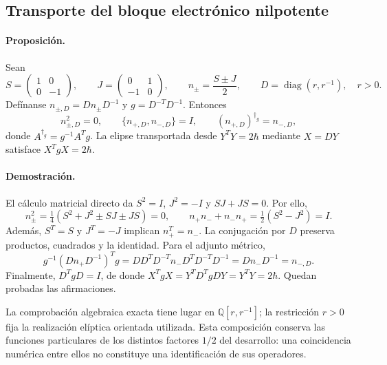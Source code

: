 \subsection{Transporte del bloque electrónico nilpotente}
\label{md:compos:nilpotentes}

\paragraph{Proposición.}
Sean
\begin{equation}
 S=\begin{pmatrix}1&0\\0&-1\end{pmatrix},\qquad
 J=\begin{pmatrix}0&1\\-1&0\end{pmatrix},\qquad
 n_\pm=\frac{S\pm J}{2},\qquad
 D=\operatorname{diag}(r,r^{-1}),\quad r>0.
 \label{md:compos:bloque-nilpotente}
\end{equation}
Defínanse $n_{\pm,D}=Dn_\pm D^{-1}$ y $g=D^{-T}D^{-1}$. Entonces
\begin{equation}
 n_{\pm,D}^2=0,\qquad
 \{n_{+,D},n_{-,D}\}=I,\qquad
 (n_{+,D})^{\dagger_g}=n_{-,D},
 \label{md:compos:identidades-nilpotentes}
\end{equation}
donde $A^{\dagger_g}=g^{-1}A^Tg$. La elipse transportada desde
$Y^TY=2\hbar$ mediante $X=DY$ satisface $X^TgX=2\hbar$.

\paragraph{Demostración.}
El cálculo matricial directo da
$S^2=I$, $J^2=-I$ y $SJ+JS=0$. Por ello,
\[
 n_\pm^2=\tfrac14(S^2+J^2\pm SJ\pm JS)=0,
 \qquad
 n_+n_-+n_-n_+=\tfrac12(S^2-J^2)=I.
\]
Además, $S^T=S$ y $J^T=-J$ implican $n_+^T=n_-$. La conjugación por $D$
preserva productos, cuadrados y la identidad. Para el adjunto métrico,
\[
 g^{-1}(Dn_+D^{-1})^Tg
 =DD^T D^{-T}n_-D^T D^{-T}D^{-1}
 =Dn_-D^{-1}=n_{-,D}.
\]
Finalmente, $D^TgD=I$, de donde
$X^TgX=Y^TD^TgDY=Y^TY=2\hbar$. Quedan probadas las afirmaciones.

La comprobación algebraica exacta tiene lugar en
$\mathbb Q[r,r^{-1}]$; la restricción $r>0$ fija la realización elíptica
orientada utilizada. Esta composición conserva las funciones particulares
de los distintos factores $1/2$ del desarrollo: una coincidencia numérica
entre ellos no constituye una identificación de sus operadores.
